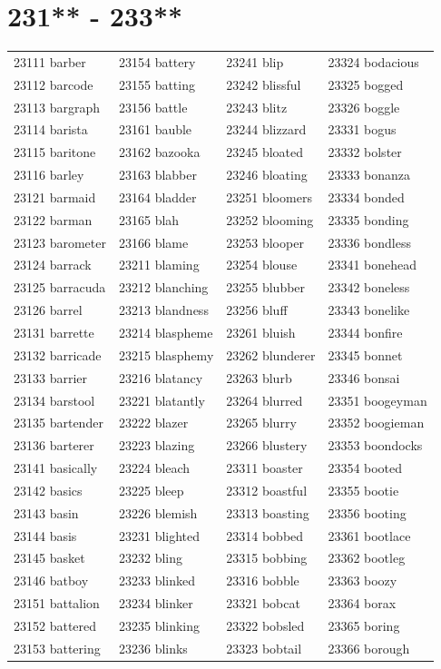 \documentclass[10pt, oneside]{book}
\begin{document}
\begin{table}
	\centering
	\section*{231** - 233**}
	\begin{tabular}{l l l l}
23111 barber &23154 battery &23241 blip &23324 bodacious\\
23112 barcode &23155 batting &23242 blissful &23325 bogged\\
23113 bargraph &23156 battle &23243 blitz &23326 boggle\\
23114 barista &23161 bauble &23244 blizzard &23331 bogus\\
23115 baritone &23162 bazooka &23245 bloated &23332 bolster\\
23116 barley &23163 blabber &23246 bloating &23333 bonanza\\
23121 barmaid &23164 bladder &23251 bloomers &23334 bonded\\
23122 barman &23165 blah &23252 blooming &23335 bonding\\
23123 barometer &23166 blame &23253 blooper &23336 bondless\\
23124 barrack &23211 blaming &23254 blouse &23341 bonehead\\
23125 barracuda &23212 blanching &23255 blubber &23342 boneless\\
23126 barrel &23213 blandness &23256 bluff &23343 bonelike\\
23131 barrette &23214 blaspheme &23261 bluish &23344 bonfire\\
23132 barricade &23215 blasphemy &23262 blunderer &23345 bonnet\\
23133 barrier &23216 blatancy &23263 blurb &23346 bonsai\\
23134 barstool &23221 blatantly &23264 blurred &23351 boogeyman\\
23135 bartender &23222 blazer &23265 blurry &23352 boogieman\\
23136 barterer &23223 blazing &23266 blustery &23353 boondocks\\
23141 basically &23224 bleach &23311 boaster &23354 booted\\
23142 basics &23225 bleep &23312 boastful &23355 bootie\\
23143 basin &23226 blemish &23313 boasting &23356 booting\\
23144 basis &23231 blighted &23314 bobbed &23361 bootlace\\
23145 basket &23232 bling &23315 bobbing &23362 bootleg\\
23146 batboy &23233 blinked &23316 bobble &23363 boozy\\
23151 battalion &23234 blinker &23321 bobcat &23364 borax\\
23152 battered &23235 blinking &23322 bobsled &23365 boring\\
23153 battering &23236 blinks &23323 bobtail &23366 borough\\
	\end{tabular}
 \end{table}
\clearpage
\end{document}
